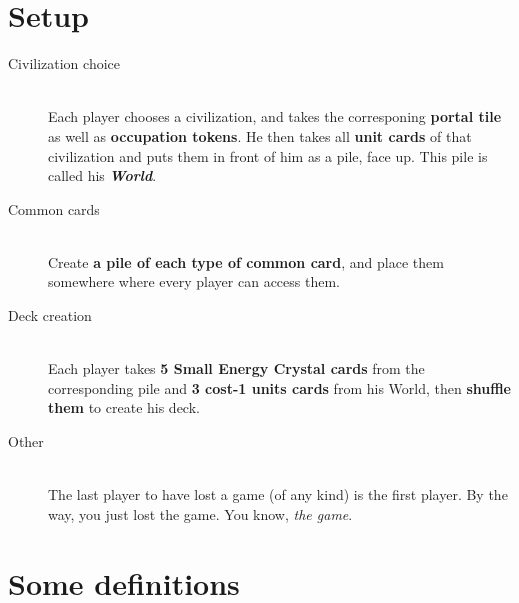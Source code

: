 \documentclass[a4paper]{article}
\begin{document}
\newpage
\section{Setup}

    \begin{description}
        \item[Civilization choice] \hfill \\
            Each player chooses a civilization, and takes the corresponing
            \textbf{portal tile} as well as \textbf{occupation tokens}.
            He then takes all \textbf{unit cards} of that civilization and puts them
            in front of him as a pile, face up.
            This pile is called his \textit{\textbf{World}}.
        \item[Common cards] \hfill \\
            Create \textbf{a pile of each type of common card},
            and place them somewhere where every player can access them.
        \item[Deck creation] \hfill \\
            Each player takes \textbf{5 Small Energy Crystal cards}
            from the corresponding pile and \textbf{3 cost-1 units cards} from his World,
            then \textbf{shuffle them} to create his deck.
        \item[Other] \hfill \\
            The last player to have lost a game (of any kind) is the first player.
            By the way, you just lost the game. You know, \textit{the game}.
    \end{description}


\section{Some definitions}
\end{document}
